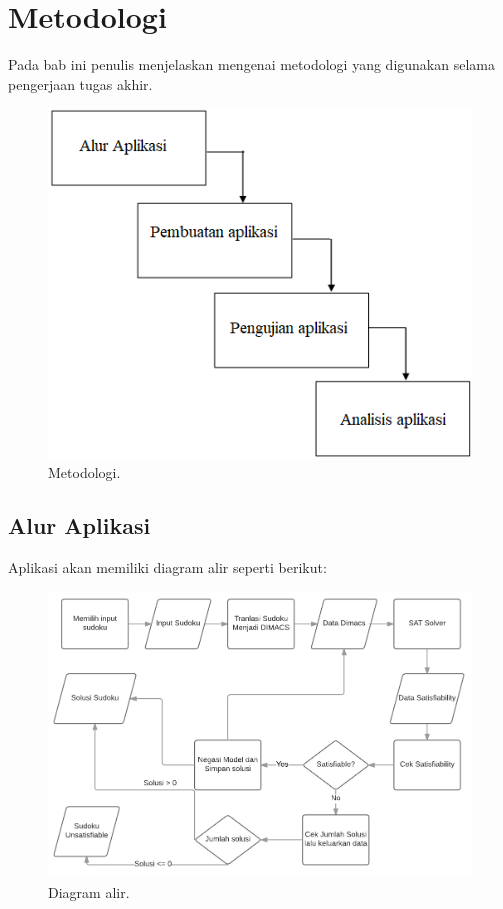 \chapter{Metodologi}

Pada bab ini penulis menjelaskan mengenai metodologi yang digunakan selama pengerjaan tugas akhir.

\begin{figure}[H]
	\begin{centering}
		\includegraphics[scale=0.7]{metodologi_proposal}
		
		\caption{Metodologi.}
	\end{centering}
\end{figure}


\section{Alur Aplikasi}

Aplikasi akan memiliki diagram alir seperti berikut:

\begin{figure}[H]
	\begin{centering}
		\includegraphics[scale=0.5]{gambar/diagramAlir.png}
		
		\caption{Diagram alir.}
	\end{centering}
\end{figure}

